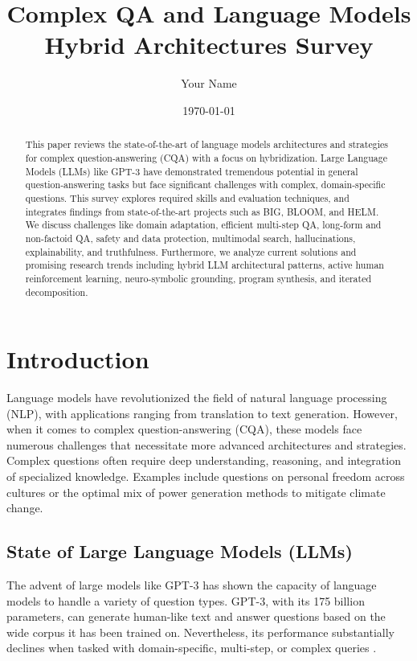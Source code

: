 \documentclass{article}
\title{Complex QA and Language Models Hybrid Architectures Survey}
\author{Your Name}
\date{\today}
\begin{document}
\maketitle

\begin{abstract}
This paper reviews the state-of-the-art of language models architectures and strategies for complex question-answering (CQA) with a focus on hybridization. Large Language Models (LLMs) like GPT-3 have demonstrated tremendous potential in general question-answering tasks but face significant challenges with complex, domain-specific questions. This survey explores required skills and evaluation techniques, and integrates findings from state-of-the-art projects such as BIG, BLOOM, and HELM. We discuss challenges like domain adaptation, efficient multi-step QA, long-form and non-factoid QA, safety and data protection, multimodal search, hallucinations, explainability, and truthfulness. Furthermore, we analyze current solutions and promising research trends including hybrid LLM architectural patterns, active human reinforcement learning, neuro-symbolic grounding, program synthesis, and iterated decomposition. 

\end{abstract}

\tableofcontents

\section{Introduction}
\label{sec:introduction}

Language models have revolutionized the field of natural language processing (NLP), with applications ranging from translation to text generation. However, when it comes to complex question-answering (CQA), these models face numerous challenges that necessitate more advanced architectures and strategies. Complex questions often require deep understanding, reasoning, and integration of specialized knowledge. Examples include questions on personal freedom across cultures or the optimal mix of power generation methods to mitigate climate change.

\subsection{State of Large Language Models (LLMs)}
The advent of large models like GPT-3 \cite{brown2020language} has shown the capacity of language models to handle a variety of question types. GPT-3, with its 175 billion parameters, can generate human-like text and answer questions based on the wide corpus it has been trained on. Nevertheless, its performance substantially declines when tasked with domain-specific, multi-step, or complex queries \cite{bubeck2023sparks}.
\end{document}
